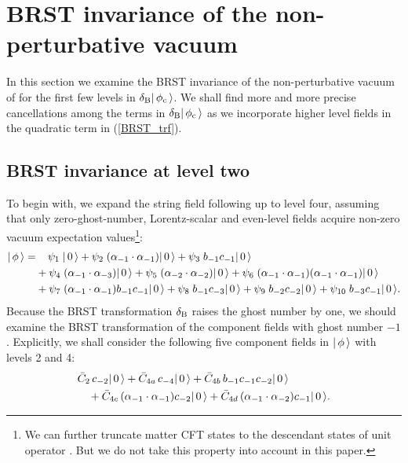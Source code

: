 \documentclass[a4paper,12pt]{article}
\begin{document}
\section{BRST invariance of the non-perturbative vacuum}
\label{sec:BRST-inv}

In this section we examine the BRST invariance of the
non-perturbative vacuum of \cite{Moeller:2000xv} for the first few
levels in $\delta_{\text B} |\, \phi_{\text c}\, \rangle$.
We shall find more and more precise cancellations among the terms in
$\delta_{\text B} |\, \phi_{\text c}\, \rangle$ as we incorporate higher level fields in
the quadratic term in (\ref{BRST_trf}).

\subsection{BRST invariance at level two}
\label{sec:c-2}

To begin with, we expand the string field following
\cite{Moeller:2000xv} up to level four,
assuming that only zero-ghost-number, Lorentz-scalar and even-level
fields acquire non-zero vacuum expectation values\footnote{
We can further truncate matter CFT states to
the descendant states of unit operator \cite{Sen:1999xm}.
But we do not take this property into account in this paper.
}:
\begin{align}
  \begin{split}
    \ket{\phi} = & \ph{+i}\psi_1 \;\ket{0}
                 + \psi_2 \;\alal{-1}{-1}\ket{0}
                 + \psi_3 \;\bc{-1}{-1}\ket{0}\\
               & + \psi_4 \;\alal{-1}{-3}\ket{0}
                 + \psi_5 \;\alal{-2}{-2}\ket{0}
                 + \psi_6 \;\alal{-1}{-1}\alal{-1}{-1}\ket{0} \\
               & + \psi_7 \;\alal{-1}{-1}\bc{-1}{-1}\ket{0}
                 + \psi_8 \;\bc{-1}{-3}\ket{0}
                 + \psi_9 \;\bc{-2}{-2}\ket{0}
                 + \psi_{10} \;\bc{-3}{-1}\ket{0}.
   \end{split}
\end{align}
Because the BRST transformation $\delta_{\text B}$ raises the ghost number by
one, we should examine the
BRST transformation of the component fields with ghost number $-1$.
Explicitly, we shall consider the following five component fields
in $|\, \phi\, \rangle$ with levels 2 and 4:
\begin{equation}
  \begin{split}
      \label{barC}
    &\bar C_2\,c_{-2}|\, 0\, \rangle
    +\bar C_{4a}\,c_{-4}|\, 0\, \rangle
    +\bar C_{4b}\,b_{-1}c_{-1}c_{-2}|\, 0\, \rangle \\
    &\quad +\bar C_{4c}\,(\alpha_{-1}\cdot\alpha_{-1})c_{-2}|\, 0\, \rangle
    +\bar C_{4d}\,(\alpha_{-1}\cdot\alpha_{-2})c_{-1}|\, 0\, \rangle .
  \end{split}
\end{equation}
\end{document}
